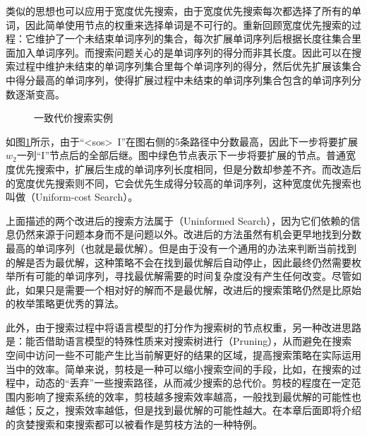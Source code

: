 \parinterval 类似的思想也可以应用于宽度优先搜索，由于宽度优先搜索每次都选择了所有的单词，因此简单使用节点的权重来选择单词是不可行的。重新回顾宽度优先搜索的过程：它维护了一个未结束单词序列的集合，每次扩展单词序列后根据长度往集合里面加入单词序列。而搜索问题关心的是单词序列的得分而非其长度。因此可以在搜索过程中维护未结束的单词序列集合里每个单词序列的得分，然后优先扩展该集合中得分最高的单词序列，使得扩展过程中未结束的单词序列集合包含的单词序列分数逐渐变高。

\begin{figure}[htp]
    \centering
 	
	\caption{一致代价搜索实例}
    \label{fig:2-17}
\end{figure}

\parinterval 如图\ref{fig:2-17}所示，由于“<sos>\ I”在图右侧的5条路径中分数最高，因此下一步将要扩展$w_2$一列“I”节点后的全部后继。图中绿色节点表示下一步将要扩展的节点。普通宽度优先搜索中，扩展后生成的单词序列长度相同，但是分数却参差不齐。而改造后的宽度优先搜索则不同，它会优先生成得分较高的单词序列，这种宽度优先搜索也叫做{\small{}}（Uniform-cost Search）。

\parinterval 上面描述的两个改进后的搜索方法属于{\small{}}（Uninformed Search），因为它们依赖的信息仍然来源于问题本身而不是问题以外。改进后的方法虽然有机会更早地找到分数最高的单词序列（也就是最优解）。但是由于没有一个通用的办法来判断当前找到的解是否为最优解，这种策略不会在找到最优解后自动停止，因此最终仍然需要枚举所有可能的单词序列，寻找最优解需要的时间复杂度没有产生任何改变。尽管如此，如果只是需要一个相对好的解而不是最优解，改进后的搜索策略仍然是比原始的枚举策略更优秀的算法。

\parinterval 此外，由于搜索过程中将语言模型的打分作为搜索树的节点权重，另一种改进思路是：能否借助语言模型的特殊性质来对搜索树进行{\small{}}（Pruning），从而避免在搜索空间中访问一些不可能产生比当前解更好的结果的区域，提高搜索策略在实际运用当中的效率。简单来说，剪枝是一种可以缩小搜索空间的手段，比如，在搜索的过程中，动态的“丢弃”一些搜索路径，从而减少搜索的总代价。剪枝的程度在一定范围内影响了搜索系统的效率，剪枝越多搜索效率越高，一般找到最优解的可能性也越低；反之，搜索效率越低，但是找到最优解的可能性越大。在本章后面即将介绍的贪婪搜索和束搜索都可以被看作是剪枝方法的一种特例。

